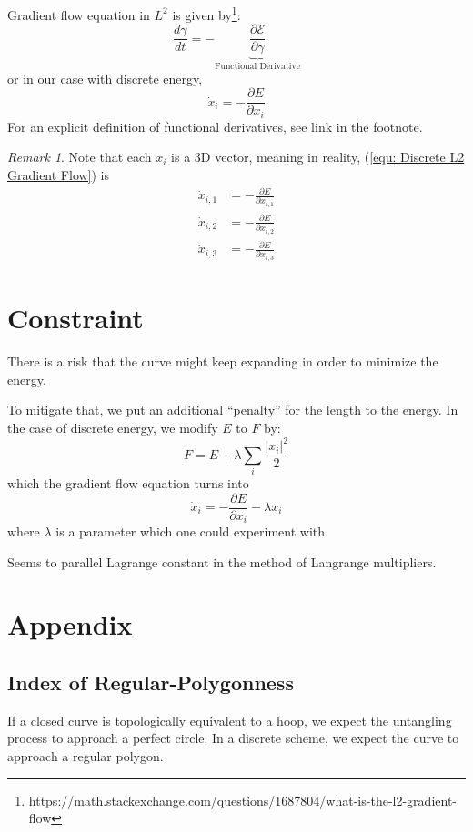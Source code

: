 \documentclass[a4paper, 11pt]{article}
\theoremstyle{definition}
\theoremstyle{remark}
\newtheorem{remark}{Remark}
\begin{document}
Gradient flow equation in $L^2$ is given by\footnote{
    https://math.stackexchange.com/questions/1687804/what-is-the-l2-gradient-flow
}:
\begin{equation}
    \frac{d \gamma}{dt} = - \underbrace{\frac{\partial \mathcal{E}}{\partial \gamma}}_{\text{Functional Derivative}}
\end{equation}
or in our case with discrete energy,
\begin{equation}
    \dot{x}_i = - \frac{\partial E}{\partial x_i}
    \label{equ: Discrete L2 Gradient Flow}
\end{equation}
For an explicit definition of functional derivatives, see link in the footnote.

\begin{remark}
    Note that each $x_i$ is a 3D vector,
    meaning in reality, (\ref{equ: Discrete L2 Gradient Flow}) is
    \begin{align}
        \dot{x}_{i, 1} &= -\frac{\partial E}{\partial x_{i, 1}} \\
        \dot{x}_{i, 2} &= -\frac{\partial E}{\partial x_{i, 2}} \\
        \dot{x}_{i, 3} &= -\frac{\partial E}{\partial x_{i, 3}}
    \end{align}
\end{remark}

\section{Constraint}
There is a risk that the curve might keep expanding in order to minimize the energy.

To mitigate that, we put an additional ``penalty'' for the length to the energy.
In the case of discrete energy, we modify $E$ to $F$ by:
\begin{equation}
    F = E + \lambda \sum_i \frac{|x_i|^2}{2}
\end{equation}
which the gradient flow equation turns into
\begin{equation}
    \dot{x}_i =  - \frac{\partial E}{\partial x_i} - \lambda x_i
\end{equation}
where $\lambda$ is a parameter which one could experiment with.

Seems to parallel Lagrange constant in the method of Langrange multipliers.
\section{Appendix}
\subsection{Index of Regular-Polygonness}
If a closed curve is topologically equivalent to a hoop, we expect the untangling process to approach a perfect circle.
In a discrete scheme, we expect the curve to approach a regular polygon.
\end{document}
